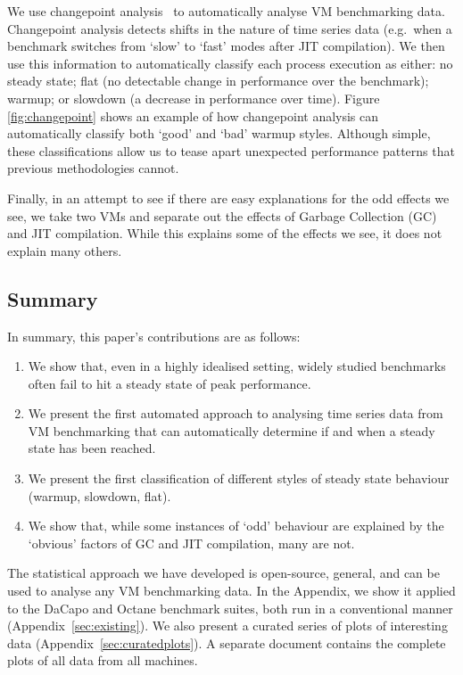 \documentclass[acmsmall]{acmart}\settopmatter{printfolios=true}
\begin{document}
We use changepoint analysis~\cite{eckley11analysis} to
automatically analyse VM benchmarking data. Changepoint analysis detects
shifts in the nature of time series data (e.g.~when a benchmark switches
from `slow' to `fast' modes after JIT compilation). We then use this
information to automatically classify each process execution as either:
no steady state; flat (no detectable change in performance
over the benchmark); warmup; or slowdown (a decrease in performance over time).
Figure \ref{fig:changepoint} shows an example of how changepoint analysis
can automatically classify both `good' and `bad' warmup styles.
Although simple, these classifications allow us to tease apart
unexpected performance patterns that previous methodologies cannot.

Finally, in an attempt to see if there are easy explanations for the odd
effects we see, we take two VMs and separate out the
effects of Garbage Collection (GC) and JIT compilation. While this explains
some of the effects we see, it does not explain many others.


\subsection{Summary}

In summary, this paper's contributions are as follows:
\begin{enumerate}
    \item We show that, even in a highly idealised setting, widely studied benchmarks
often fail to hit a steady state of peak performance.
    \item We present the first automated approach to analysing time series
data from VM benchmarking that can automatically determine if and when a steady
state has been reached.
    \item We present the first classification of different styles of
steady state behaviour (warmup, slowdown, flat).
    \item We show that, while some instances of `odd' behaviour are explained by
the `obvious' factors of GC and JIT compilation, many are not.
\end{enumerate}

The statistical approach we have developed is open-source, general, and can be used
to analyse any VM benchmarking data. In the Appendix, we show it applied
to the DaCapo and Octane benchmark suites,
both run in a conventional manner (Appendix~\ref{sec:existing}). We also present a curated
series of plots of interesting data (Appendix~\ref{sec:curatedplots}). A
separate document contains the complete plots of all data from all machines.
\end{document}
